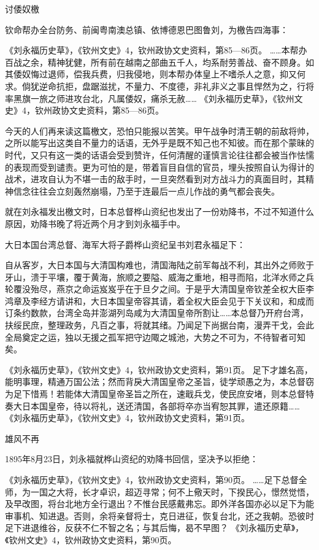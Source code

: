 \documentclass[12pt,UTF8]{ctexbook}
\begin{document}
讨倭奴檄

钦命帮办全台防务、前闽粤南澳总镇、依博德恩巴图鲁刘，为檄告四海事：

《刘永福历史草》，《钦州文史》4，钦州政协文史资料，第85—86页。
……本帮办百战之余，精神犹健，所有前在越南之部曲五千人，均系耐劳善战、奋不顾身。如其倭奴悔过退师，偿我兵费，归我侵地，则本帮办体皇上不嗜杀人之意，抑又何求。倘犹逆命抗拒，盘踞滋扰，不量力、不度德，非礼非义之事且悍然为之，行将率黑旗一旅之师进攻台北，凡属倭奴，痛杀无赦…… 《刘永福历史草》，《钦州文史》4，钦州政协文史资料，第85—86页。

今天的人们再来读这篇檄文，恐怕只能报以苦笑。甲午战争时清王朝的前敌将帅，之所以能写出这类自不量力的话语，无外乎是既不知己也不知彼。而在那个蒙昧的时代，又只有这一类的话语会受到赞许，任何清醒的谨慎言论往往都会被当作怯懦的表现而受到谴责。更为可怕的是，带着盲目自信的官员，埋头按照自认为得计的战术，进攻自认为不堪一击的敌手时，一旦突然看到对方战斗力的真面目时，其精神信念往往会立刻轰然崩塌，乃至于连最后一点儿作战的勇气都会丧失。

就在刘永福发出檄文时，日本总督桦山资纪也发出了一份劝降书，不过不知道什么原因，劝降书晚了将近两个月才到刘永福手中。

大日本国台湾总督、海军大将子爵桦山资纪呈书刘君永福足下：

自从客岁，大日本国与大清国构难也，清国海陆之前军每战不利，其出外之师败于牙山，溃于平壤，覆于黄海，旅顺之要隘、威海之重地，相寻而陷，北洋水师之兵轮覆没殆尽，燕京之命运岌岌乎在于旦夕之间。于是乎大清国皇帝钦差全权大臣李鸿章及李经方请讲和，大日本国皇帝容其请，着全权大臣会见于下关议和，和成而订条约数款，台湾全岛并澎湖列岛咸为大清国皇帝所割让……本总督乃开府台湾，扶绥民庶，整理政务，凡百之事，将就其绪。乃闻足下尚据台南，漫弄干戈，会此全局奠定之运，独以无援之孤军把守边陬之城池，大势之不可为，不待智者可知矣。

《刘永福历史草》，《钦州文史》4，钦州政协文史资料，第91页。
足下才雄名高，能明事理，精通万国公法；然而背戾大清国皇帝之圣旨，徒学顽愚之为，本总督窃为足下惜焉！若能体大清国皇帝圣旨之所在，速戢兵戈，使民庶安堵，则本总督特奏大日本国皇帝，待以将礼，送还清国，各部将卒亦当宥恕其罪，遣还原籍…… 《刘永福历史草》，《钦州文史》4，钦州政协文史资料，第91页。

雄风不再

1895年8月23日，刘永福就桦山资纪的劝降书回信，坚决予以拒绝：

《刘永福历史草》，《钦州文史》4，钦州政协文史资料，第90页。
……足下总督全师，为一国之大将，长才卓识，超迈寻常；何不上儆天时，下揆民心，憬然觉悟，及早改图，将台北地方全行退出？不惟台民感戴弗忘。即外洋各国亦必以足下为能审事机、知进退。否则，余将亲督将士，克日进征，恢复台北，还之我朝。恐彼时足下进退维谷，反获不仁不智之名；与其后悔，曷不早图？ 《刘永福历史草》，《钦州文史》4，钦州政协文史资料，第90页。
\end{document}
